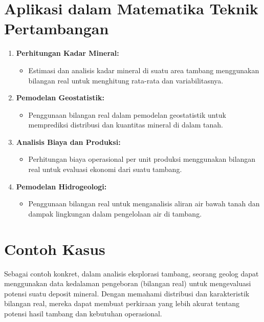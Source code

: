 \documentclass[
]{book}
\providecommand{\tightlist}{%
  \setlength{\itemsep}{0pt}\setlength{\parskip}{0pt}}
\begin{document}
\section{Aplikasi dalam Matematika Teknik Pertambangan}\label{aplikasi-dalam-matematika-teknik-pertambangan}

\begin{enumerate}
\def\labelenumi{\arabic{enumi}.}
\tightlist
\item
  \textbf{Perhitungan Kadar Mineral:}

  \begin{itemize}
  \tightlist
  \item
    Estimasi dan analisis kadar mineral di suatu area tambang menggunakan bilangan real untuk menghitung rata-rata dan variabilitasnya.
  \end{itemize}
\item
  \textbf{Pemodelan Geostatistik:}

  \begin{itemize}
  \tightlist
  \item
    Penggunaan bilangan real dalam pemodelan geostatistik untuk memprediksi distribusi dan kuantitas mineral di dalam tanah.
  \end{itemize}
\item
  \textbf{Analisis Biaya dan Produksi:}

  \begin{itemize}
  \tightlist
  \item
    Perhitungan biaya operasional per unit produksi menggunakan bilangan real untuk evaluasi ekonomi dari suatu tambang.
  \end{itemize}
\item
  \textbf{Pemodelan Hidrogeologi:}

  \begin{itemize}
  \tightlist
  \item
    Penggunaan bilangan real untuk menganalisis aliran air bawah tanah dan dampak lingkungan dalam pengelolaan air di tambang.
  \end{itemize}
\end{enumerate}

\section{Contoh Kasus}\label{contoh-kasus}

Sebagai contoh konkret, dalam analisis eksplorasi tambang, seorang geolog dapat menggunakan data kedalaman pengeboran (bilangan real) untuk mengevaluasi potensi suatu deposit mineral. Dengan memahami distribusi dan karakteristik bilangan real, mereka dapat membuat perkiraan yang lebih akurat tentang potensi hasil tambang dan kebutuhan operasional.
\end{document}

